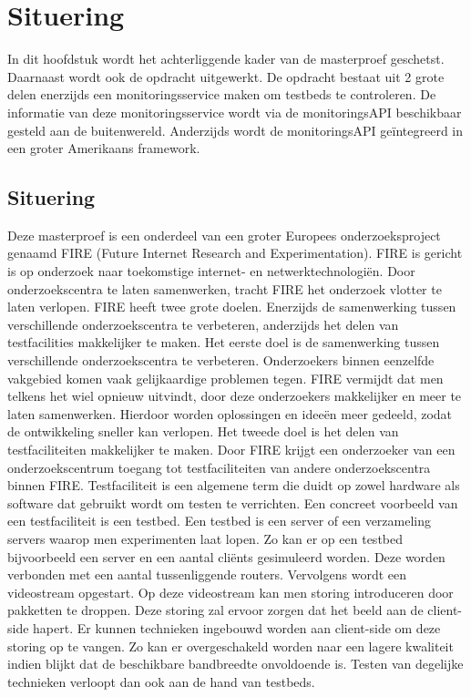 \chapter{Situering}
{\samenvatting
In dit hoofdstuk wordt het achterliggende kader van de masterproef geschetst. Daarnaast wordt ook de opdracht uitgewerkt. De opdracht bestaat uit 2 grote delen enerzijds een monitoringsservice maken om testbeds te controleren. De informatie van deze monitoringsservice wordt via de monitoringsAPI beschikbaar gesteld aan de buitenwereld. Anderzijds wordt de monitoringsAPI geïntegreerd in een groter Amerikaans framework.}
\section{Situering}
\npar
Deze masterproef is een onderdeel van een groter Europees onderzoeksproject genaamd FIRE (Future Internet Research and Experimentation). FIRE is gericht is op onderzoek naar toekomstige internet- en netwerktechnologiën. Door onderzoekscentra te laten samenwerken\citep{Fire-what-is}, tracht FIRE het onderzoek vlotter te laten verlopen. FIRE heeft twee grote doelen. Enerzijds de samenwerking tussen verschillende onderzoekscentra te verbeteren, anderzijds het delen van testfacilities makkelijker te maken.
\npar
Het eerste doel is de samenwerking tussen verschillende onderzoekscentra te verbeteren. Onderzoekers binnen eenzelfde vakgebied komen vaak gelijkaardige problemen tegen. FIRE vermijdt dat men telkens het wiel opnieuw uitvindt, door deze onderzoekers makkelijker en meer te laten samenwerken. Hierdoor worden oplossingen en ideeën meer gedeeld, zodat de ontwikkeling sneller kan verlopen.
\clearpage
\npar
Het tweede doel is het delen van testfaciliteiten makkelijker te maken. Door FIRE krijgt een onderzoeker van een onderzoekscentrum toegang tot testfaciliteiten van andere onderzoekscentra binnen FIRE. Testfaciliteit is een algemene term die duidt op zowel hardware als software dat gebruikt wordt om testen te verrichten. Een concreet voorbeeld van een testfaciliteit is een testbed. Een testbed is een server of een verzameling servers waarop men experimenten laat lopen. Zo kan er op een testbed bijvoorbeeld een server en een aantal cli\"ents gesimuleerd worden. Deze worden verbonden met een aantal tussenliggende routers. Vervolgens wordt een videostream opgestart. Op deze videostream kan men storing introduceren door pakketten te droppen. Deze storing zal ervoor zorgen dat het beeld aan de client-side hapert. Er kunnen technieken ingebouwd worden aan client-side om deze storing op te vangen. Zo kan er overgeschakeld worden naar een lagere kwaliteit indien blijkt dat de beschikbare bandbreedte onvoldoende is. Testen van degelijke technieken verloopt dan ook aan de hand van testbeds.
